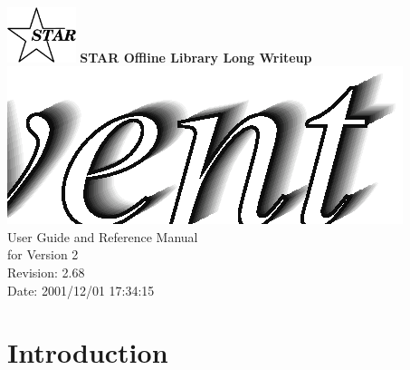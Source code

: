\documentclass[twoside]{article}
\begin{document}
%
%
\begin{titlepage}
\pagestyle{empty}
\vspace*{-25mm}
\begin{center}
  \mbox{\includegraphics[width=2cm]{StarIcon.eps}}
  {\Large\bf STAR Offline Library Long Writeup}
  \hfill\mbox{}\\[3cm]
  \mbox{\includegraphics[width=\textwidth]{StEventTitle.eps}}
  \hfill\mbox{}\\[3cm]
  {\LARGE User Guide and Reference Manual \\[5mm] for Version 2}\\[2cm]
  {\LARGE $ $Revision: 2.68 $ $}  \\[5mm] %
  {\LARGE $ $Date: 2001/12/01 17:34:15 $ $}  %
  \vfill
\end{center}
\cleardoublepage
\end{titlepage}

%
%
\tableofcontents
\cleardoublepage

%
%

\section{Introduction} %
\end{document}
